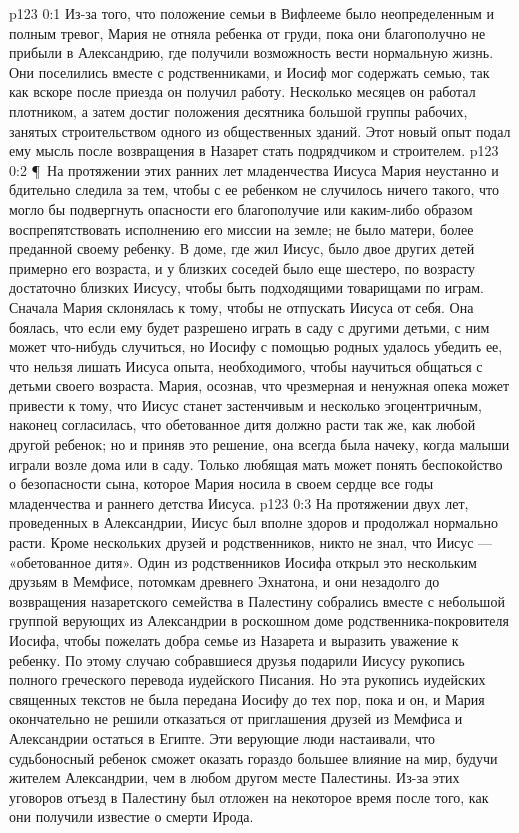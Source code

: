 \author{Комиссия срединников}
\vs p123 0:1 Из\hyp{}за того, что положение семьи в Вифлееме было неопределенным и полным тревог, Мария не отняла ребенка от груди, пока они благополучно не прибыли в Александрию, где получили возможность вести нормальную жизнь. Они поселились вместе с родственниками, и Иосиф мог содержать семью, так как вскоре после приезда он получил работу. Несколько месяцев он работал плотником, а затем достиг положения десятника большой группы рабочих, занятых строительством одного из общественных зданий. Этот новый опыт подал ему мысль после возвращения в Назарет стать подрядчиком и строителем.
\vs p123 0:2 \P\ На протяжении этих ранних лет младенчества Иисуса Мария неустанно и бдительно следила за тем, чтобы с ее ребенком не случилось ничего такого, что могло бы подвергнуть опасности его благополучие или каким\hyp{}либо образом воспрепятствовать исполнению его миссии на земле; не было матери, более преданной своему ребенку. В доме, где жил Иисус, было двое других детей примерно его возраста, и у близких соседей было еще шестеро, по возрасту достаточно близких Иисусу, чтобы быть подходящими товарищами по играм. Сначала Мария склонялась к тому, чтобы не отпускать Иисуса от себя. Она боялась, что если ему будет разрешено играть в саду с другими детьми, с ним может что\hyp{}нибудь случиться, но Иосифу с помощью родных удалось убедить ее, что нельзя лишать Иисуса опыта, необходимого, чтобы научиться общаться с детьми своего возраста. Мария, осознав, что чрезмерная и ненужная опека может привести к тому, что Иисус станет застенчивым и несколько эгоцентричным, наконец согласилась, что обетованное дитя должно расти так же, как любой другой ребенок; но и приняв это решение, она всегда была начеку, когда малыши играли возле дома или в саду. Только любящая мать может понять беспокойство о безопасности сына, которое Мария носила в своем сердце все годы младенчества и раннего детства Иисуса.
\vs p123 0:3 На протяжении двух лет, проведенных в Александрии, Иисус был вполне здоров и продолжал нормально расти. Кроме нескольких друзей и родственников, никто не знал, что Иисус --- «обетованное дитя». Один из родственников Иосифа открыл это нескольким друзьям в Мемфисе, потомкам древнего Эхнатона, и они незадолго до возвращения назаретского семейства в Палестину собрались вместе с небольшой группой верующих из Александрии в роскошном доме родственника\hyp{}покровителя Иосифа, чтобы пожелать добра семье из Назарета и выразить уважение к ребенку. По этому случаю собравшиеся друзья подарили Иисусу рукопись полного греческого перевода иудейского Писания. Но эта рукопись иудейских священных текстов не была передана Иосифу до тех пор, пока и он, и Мария окончательно не решили отказаться от приглашения друзей из Мемфиса и Александрии остаться в Египте. Эти верующие люди настаивали, что судьбоносный ребенок сможет оказать гораздо большее влияние на мир, будучи жителем Александрии, чем в любом другом месте Палестины. Из\hyp{}за этих уговоров отъезд в Палестину был отложен на некоторое время после того, как они получили известие о смерти Ирода.
